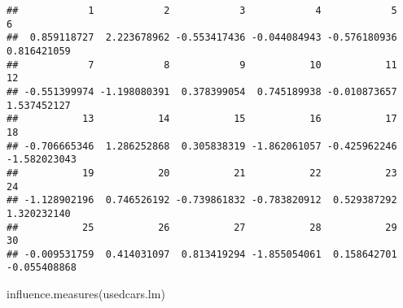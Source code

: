 \documentclass[
]{book}
\newenvironment{Shaded}{\begin{snugshade}}{\end{snugshade}}
\newcommand{\FunctionTok}[1]{\textcolor[rgb]{0.00,0.00,0.00}{#1}}
\newcommand{\NormalTok}[1]{#1}
\begin{document}
\begin{verbatim}
##            1            2            3            4            5            6 
##  0.859118727  2.223678962 -0.553417436 -0.044084943 -0.576180936  0.816421059 
##            7            8            9           10           11           12 
## -0.551399974 -1.198080391  0.378399054  0.745189938 -0.010873657  1.537452127 
##           13           14           15           16           17           18 
## -0.706665346  1.286252868  0.305838319 -1.862061057 -0.425962246 -1.582023043 
##           19           20           21           22           23           24 
## -1.128902196  0.746526192 -0.739861832 -0.783820912  0.529387292  1.320232140 
##           25           26           27           28           29           30 
## -0.009531759  0.414031097  0.813419294 -1.855054061  0.158642701 -0.055408868
\end{verbatim}

\begin{Shaded}
\begin{Highlighting}[]
\FunctionTok{influence.measures}\NormalTok{(usedcars.lm)}
\end{Highlighting}
\end{Shaded}
\end{document}
